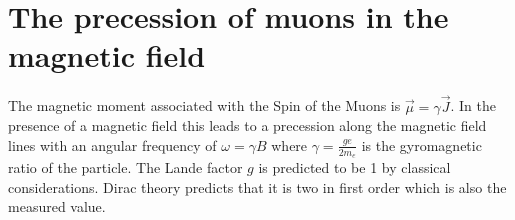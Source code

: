 \section{The precession of muons in the magnetic field}
The magnetic moment associated with the Spin of the Muons is $\vec \mu = \gamma \vec J$. In the presence of a magnetic field this leads to a precession along the magnetic field lines with an angular frequency of $\omega = \gamma B$ where $\gamma = \frac{g e}{2 m_e}$ is the gyromagnetic ratio of the particle. The Lande factor $g$ is predicted to be 1 by classical considerations. Dirac theory predicts that it is two in first order which is also the measured value.